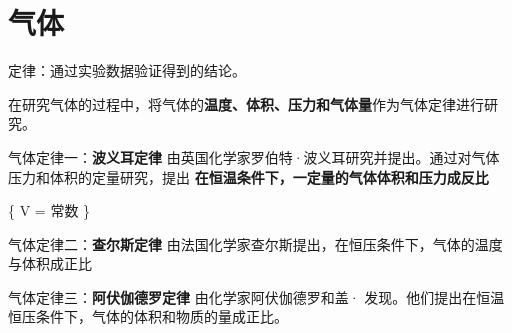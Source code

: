 \section{气体}
定律：通过实验数据验证得到的结论。

在研究气体的过程中，将气体的\textbf{温度、体积、压力和气体量}作为气体定律进行研究。

气体定律一：\textbf{波义耳定律} 由英国化学家罗伯特·波义耳研究并提出。通过对气体压力和体积的定量研究，提出 \textbf{在恒温条件下，一定量的气体体积和压力成反比}

\{ V = 常数 \}

气体定律二：\textbf{查尔斯定律} 由法国化学家查尔斯提出，在恒压条件下，气体的温度与体积成正比

气体定律三：\textbf{阿伏伽德罗定律} 由化学家阿伏伽德罗和盖· 发现。他们提出在恒温恒压条件下，气体的体积和物质的量成正比。
